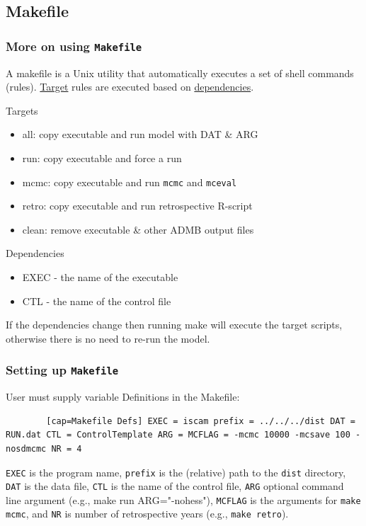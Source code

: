 \subsection{Makefile} 

\label{sub:makefile} 
\begin{frame}
	[shrink=10] \frametitle{More on using \texttt{Makefile} } A makefile is a Unix utility that automatically executes a set of shell commands (rules). \underline{Target} rules are executed based on \underline{dependencies}.
	\begin{block}
		{Targets} 
		\begin{itemize}
			\item all: copy executable and run model with DAT \& ARG 
			\item run: copy executable and force a run 
			\item mcmc: copy executable and run \texttt{mcmc} and \texttt{mceval} 
			\item retro: copy executable and run retrospective R-script 
			\item clean: remove executable \& other ADMB output files 
		\end{itemize}
	\end{block}
	\begin{block}
		{Dependencies} 
		\begin{itemize}
			\item EXEC - the name of the executable 
			\item CTL - the name of the control file 
		\end{itemize}
	\end{block}
	If the dependencies change then running make will execute the target scripts, otherwise there is no need to re-run the model. 
\end{frame}

\lstset{language=make} 
\begin{frame}
	[fragile] \frametitle{Setting up \texttt{Makefile}} User must supply variable Definitions in the Makefile: 
	\begin{lstlisting}
		[cap=Makefile Defs] EXEC = iscam prefix = ../../../dist DAT = RUN.dat CTL = ControlTemplate ARG = MCFLAG = -mcmc 10000 -mcsave 100 -nosdmcmc NR = 4 
	\end{lstlisting}
	\texttt{EXEC} is the program name, \texttt{prefix} is the (relative) path to the \texttt{dist} directory, \texttt{DAT} is the data file, \texttt{CTL} is the name of the control file, \texttt{ARG} optional command line argument (e.g., make run ARG="-nohess"), \texttt{MCFLAG} is the arguments for \texttt{make mcmc}, and \texttt{NR} is number of retrospective years (e.g., \texttt{make retro}). 
\end{frame}

